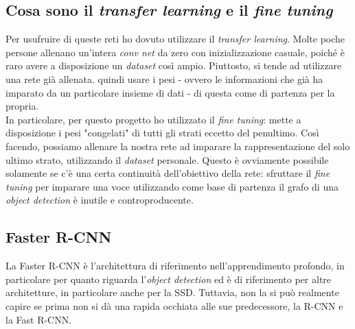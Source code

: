 \subsection{Cosa sono il \textit{transfer learning} e il \textit{fine tuning}}
Per usufruire di queste reti ho dovuto utilizzare il \textit{transfer learning}. Molte poche persone allenano un'intera \textit{conv net} da zero con inizializzazione casuale, poiché è raro avere a disposizione un \textit{dataset} così ampio. Piuttosto, si tende ad utilizzare una rete già allenata. quindi usare i pesi - ovvero le informazioni che già ha imparato da un particolare insieme di dati - di questa come di partenza per la propria. 
\medskip
\\In particolare, per questo progetto ho utilizzato il \textit{fine tuning}:  mette a disposizione i pesi "congelati" di tutti gli strati eccetto del penultimo. Così facendo, possiamo allenare la nostra rete ad imparare la rappresentazione del solo ultimo strato, utilizzando il \textit{dataset} personale. Questo è ovviamente possibile solamente se c'è una certa continuità dell'obiettivo della rete: sfruttare il \textit{fine tuning} per imparare una voce utilizzando come base di partenza il grafo di una \textit{object detection} è inutile e controproducente.

\subsection{Faster R-CNN}
La Faster R-CNN è l'architettura di riferimento nell'apprendimento profondo, in particolare per quanto riguarda l'\textit{object detection} ed è di riferimento per altre architetture, in particolare anche per la SSD. Tuttavia, non la si può realmente capire se prima non si dà una rapida occhiata alle sue predecessore, la R-CNN e la Fast R-CNN.

